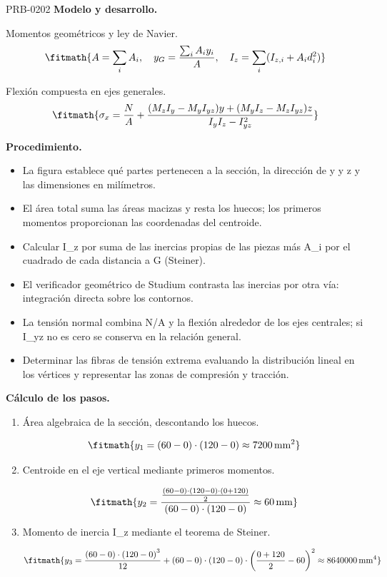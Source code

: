 \begin{studiumworked}{PRB-0202}
\textbf{Modelo y desarrollo.}

Momentos geométricos y ley de Navier.\[\fitmath{A = \sum_i A_i,\quad y_G = \frac{\sum_i A_i y_i}{A},\quad I_z = \sum_i (I_{z,i}+A_i d_i^2)}\]

Flexión compuesta en ejes generales.\[\fitmath{\sigma_x = \frac{N}{A}+\frac{(M_z I_y-M_y I_{yz})y+(M_y I_z-M_z I_{yz})z}{I_y I_z-I_{yz}^{2}}}\]

\textbf{Procedimiento.}\begin{itemize}\item La figura establece qué partes pertenecen a la sección, la dirección de y y z y las dimensiones en milímetros.
\item El área total suma las áreas macizas y resta los huecos; los primeros momentos proporcionan las coordenadas del centroide.
\item Calcular I\_z por suma de las inercias propias de las piezas más A\_i por el cuadrado de cada distancia a G (Steiner).
\item El verificador geométrico de Studium contrasta las inercias por otra vía: integración directa sobre los contornos.
\item La tensión normal combina N/A y la flexión alrededor de los ejes centrales; si I\_yz no es cero se conserva en la relación general.
\item Determinar las fibras de tensión extrema evaluando la distribución lineal en los vértices y representar las zonas de compresión y tracción.\end{itemize}

\textbf{Cálculo de los pasos.}

\begin{enumerate}

\item Área algebraica de la sección, descontando los huecos.

\[\fitmath{y_{1}=\left(60-0\right)\cdot \left(120-0\right)\approx 7200\,\mathrm{mm^{2}}}\]

\item Centroide en el eje vertical mediante primeros momentos.

\[\fitmath{y_{2}=\frac{\frac{\left(60-0\right)\cdot \left(120-0\right)\cdot \left(0+120\right)}{2}}{\left(60-0\right)\cdot \left(120-0\right)}\approx 60\,\mathrm{mm}}\]

\item Momento de inercia I\_z mediante el teorema de Steiner.

\[\fitmath{y_{3}=\frac{\left(60-0\right)\cdot {\left(120-0\right)}^{3}}{12}+\left(60-0\right)\cdot \left(120-0\right)\cdot {\left(\frac{0+120}{2}-60\right)}^{2}\approx 8640000\,\mathrm{mm^{4}}}\]


\end{enumerate}
\end{studiumworked}
